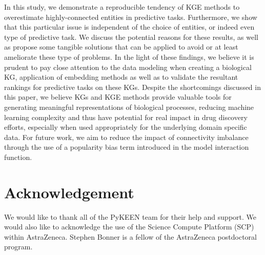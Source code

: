 In this study, we demonstrate a reproducible tendency of KGE methods to overestimate highly-connected entities in predictive tasks. Furthermore, we show that this particular issue is independent of the choice of entities, or indeed even type of predictive task. We discuss the potential reasons for these results, as well as propose some tangible solutions that can be applied to avoid or at least ameliorate these type of problems. In the light of these findings, we believe it is prudent to pay close attention to the data modeling when creating a biological KG, application of embedding methods as well as to validate the resultant rankings for predictive tasks on these KGs. Despite the shortcomings discussed in this paper, we believe KGs and KGE methods provide valuable tools for generating meaningful representations of biological processes, reducing machine learning complexity and thus have potential for real impact in drug discovery efforts, especially when used appropriately for the underlying domain specific data. For future work, we aim to reduce the impact of connectivity imbalance through the use of a popularity bias term introduced in the model interaction function.
\section*{Acknowledgement}

We would like to thank all of the PyKEEN team for their help and support. We would also like to acknowledge the use of the Science Compute Platform (SCP) within AstraZeneca. Stephen Bonner is a fellow of the AstraZeneca postdoctoral program.

